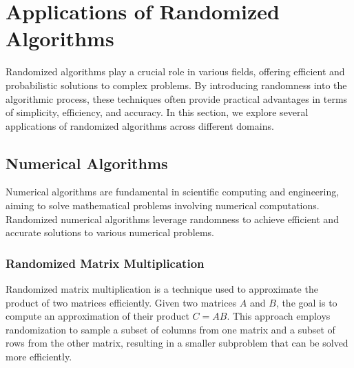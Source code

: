 \documentclass[12pt]{book} %
\begin{document}
\section{Applications of Randomized Algorithms}
Randomized algorithms play a crucial role in various fields, offering efficient and probabilistic solutions to complex problems. By introducing randomness into the algorithmic process, these techniques often provide practical advantages in terms of simplicity, efficiency, and accuracy. In this section, we explore several applications of randomized algorithms across different domains.

\subsection{Numerical Algorithms}
Numerical algorithms are fundamental in scientific computing and engineering, aiming to solve mathematical problems involving numerical computations. Randomized numerical algorithms leverage randomness to achieve efficient and accurate solutions to various numerical problems.

\subsubsection{Randomized Matrix Multiplication}
Randomized matrix multiplication is a technique used to approximate the product of two matrices efficiently. Given two matrices \(A\) and \(B\), the goal is to compute an approximation of their product \(C = AB\). This approach employs randomization to sample a subset of columns from one matrix and a subset of rows from the other matrix, resulting in a smaller subproblem that can be solved more efficiently.
\end{document}
